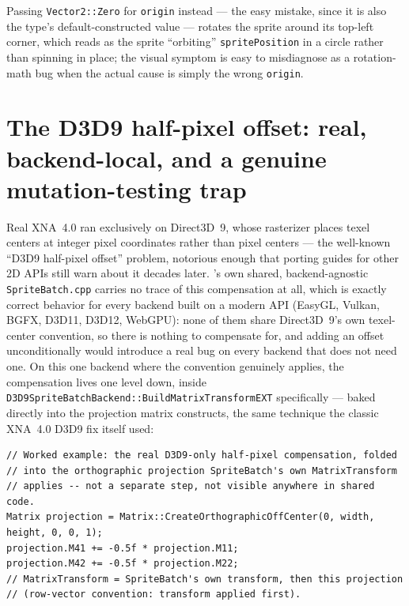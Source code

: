 Passing \texttt{Vector2::Zero} for \texttt{origin} instead --- the easy mistake, since it is
also the type's default-constructed value --- rotates the sprite around its top-left corner,
which reads as the sprite ``orbiting'' \texttt{spritePosition} in a circle rather than spinning
in place; the visual symptom is easy to misdiagnose as a rotation-math bug when the actual
cause is simply the wrong \texttt{origin}.

\section{The D3D9 half-pixel offset: real, backend-local, and a genuine mutation-testing trap}

Real XNA~4.0 ran exclusively on Direct3D~9, whose rasterizer places texel centers at integer
pixel coordinates rather than pixel centers --- the well-known ``D3D9 half-pixel offset''
problem, notorious enough that porting guides for other 2D APIs still warn about it decades
later. 's own shared, backend-agnostic \texttt{SpriteBatch.cpp} carries
no trace of this compensation at all, which is exactly correct behavior for every backend built
on a modern API (EasyGL, Vulkan, BGFX, D3D11, D3D12, WebGPU): none of them share Direct3D~9's
own texel-center convention, so there is nothing to compensate for, and adding an offset
unconditionally would introduce a real bug on every backend that does not need one. On this
one backend where the convention genuinely applies, the compensation lives one level down,
inside \texttt{D3D9SpriteBatchBackend::BuildMatrixTransformEXT} specifically --- baked directly
into the projection matrix  constructs, the same technique the classic
XNA~4.0 D3D9 fix itself used:

\begin{lstlisting}
// Worked example: the real D3D9-only half-pixel compensation, folded
// into the orthographic projection SpriteBatch's own MatrixTransform
// applies -- not a separate step, not visible anywhere in shared code.
Matrix projection = Matrix::CreateOrthographicOffCenter(0, width, height, 0, 0, 1);
projection.M41 += -0.5f * projection.M11;
projection.M42 += -0.5f * projection.M22;
// MatrixTransform = SpriteBatch's own transform, then this projection
// (row-vector convention: transform applied first).
\end{lstlisting}

